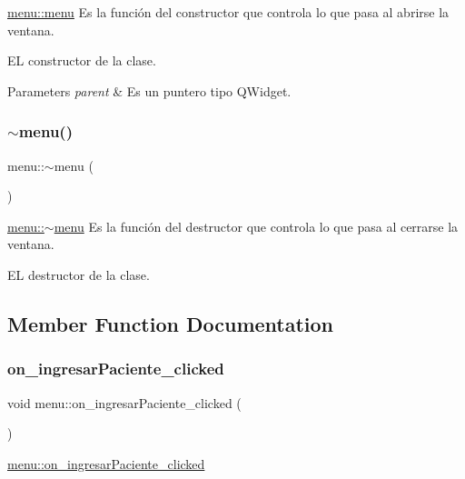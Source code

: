 \hyperlink{classmenu_aff7946ea9349eacaede63417ecea19cc}{menu\+::menu} Es la función del constructor que controla lo que pasa al abrirse la ventana. 

EL constructor de la clase.


\begin{DoxyParams}{Parameters}
{\em parent} & Es un puntero tipo Q\+Widget. \\
\hline
\end{DoxyParams}
\mbox{\label{classmenu_a5efbd22f23289b42ed68d2a9bb431f35}} 
\subsubsection{\texorpdfstring{$\sim$menu()}{~menu()}}
{\footnotesize\ttfamily menu\+::$\sim$menu (\begin{DoxyParamCaption}{ }\end{DoxyParamCaption})}



\hyperlink{classmenu_a5efbd22f23289b42ed68d2a9bb431f35}{menu\+::$\sim$menu} Es la función del destructor que controla lo que pasa al cerrarse la ventana. 

EL destructor de la clase. 

\subsection{Member Function Documentation}
\mbox{\label{classmenu_a62c11c56b58c852df09f28e2d47c82f6}} 
\subsubsection{\texorpdfstring{on\+\_\+ingresar\+Paciente\+\_\+clicked}{on\_ingresarPaciente\_clicked}}
{\footnotesize\ttfamily void menu\+::on\+\_\+ingresar\+Paciente\+\_\+clicked (\begin{DoxyParamCaption}{ }\end{DoxyParamCaption})\hspace{0.3cm}{\ttfamily [slot]}}



\hyperlink{classmenu_a62c11c56b58c852df09f28e2d47c82f6}{menu\+::on\+\_\+ingresar\+Paciente\+\_\+clicked} 

